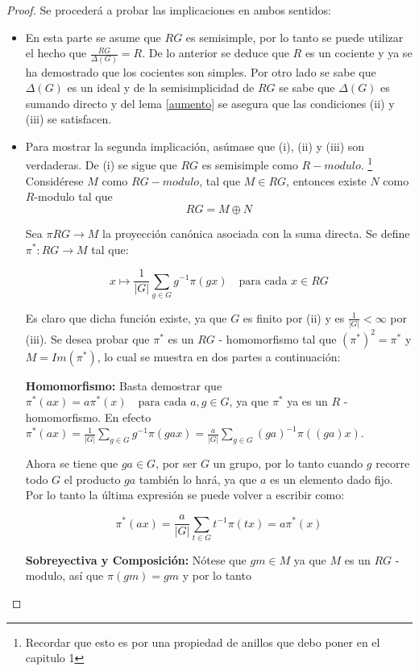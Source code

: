\begin{proof}
Se procederá a probar las implicaciones en ambos sentidos:
\begin{itemize}
\item En esta parte se asume que $RG$ es semisimple, por lo tanto se puede utilizar el hecho que $\frac{RG}{\Delta (G)} = R$. De lo anterior se deduce que $R$ es un cociente y ya se ha demostrado que los cocientes son simples. Por otro lado se sabe que $\Delta (G)$ es un ideal y de la semisimplicidad de $RG$ se sabe que $\Delta (G)$ es sumando directo y del lema \ref{aumento} se asegura que las condiciones (ii) y (iii) se satisfacen. 

\item  Para mostrar la segunda implicación, asúmase que (i), (ii) y (iii) son verdaderas. 
De (i) se sigue que $RG$ es semisimple como $R-modulo$. \footnote{Recordar que esto es por una propiedad de anillos que debo poner en el capitulo 1} Considérese $M$ como $RG-modulo$, tal que $M \in RG$, entonces existe $N$ como $R$-modulo tal que 
\[RG = M \oplus N\]

Sea $\pi  RG \to M$ la proyección canónica asociada con la suma directa. Se define $\pi ^ *  \colon RG \to M$ tal que:

\[x \mapsto \frac{1}{|G|}\sum_{g \in G} g^{-1}\pi (gx) \quad   \mbox{para cada } x \in RG \] 

Es claro que dicha función existe, ya que $G$ es finito por (ii) y es $\frac{1}{|G|} < \infty$ por (iii). Se desea probar que $\pi ^ * $ es un $RG$ - homomorfismo tal que $(\pi ^*)^2 = \pi ^* $ y $M = Im(\pi ^*)$, lo cual se muestra en dos partes a continuación:

\textbf{Homomorfismo:} \newline
Basta demostrar que $\pi ^* (ax) = a \pi^*(x) \quad \mbox{para cada } a, g \in G$, ya que $\pi^* $ ya es un $R$ - homomorfismo. En efecto $\pi^* (ax) = \frac{1}{|G|} \sum_{g \in G}g^{-1}\pi (gax) = \frac{a}{|G|} \sum_{g \in G}(ga)^{-1}\pi ((ga)x) $.

Ahora se tiene que $ga \in G$, por ser $G$ un grupo, por lo tanto cuando $g$ recorre todo $G$ el producto $ga$ también lo hará, ya que $a$ es un elemento dado fijo. Por lo tanto la última expresión se puede volver a escribir como:

\[\pi^* (ax) = \frac{a}{|G|} \sum_{t \in G}t^{-1}\pi (tx) = a\pi^*(x)\]

\textbf{Sobreyectiva y Composición:} \newline
Nótese que $gm \in M$ ya que $M$ es un $RG$ - modulo, así que $\pi (gm) = gm$ y por lo tanto 


\end{itemize}
\end{proof}
